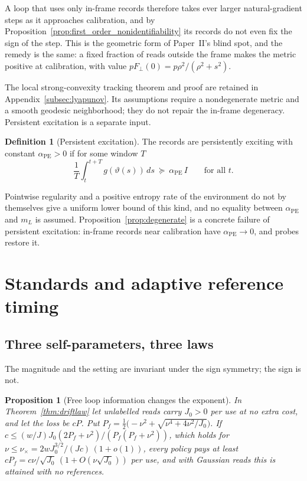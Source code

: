 \documentclass[12pt]{article}
\newtheorem{proposition}[theorem]{Proposition}
\theoremstyle{definition}
\newtheorem{definition}[theorem]{Definition}
\begin{document}
A loop that uses only in-frame records therefore takes ever larger natural-gradient steps as it approaches calibration, and by Proposition~\ref{prop:first_order_nonidentifiability} its records do not even fix the sign of the step. This is the geometric form of Paper~II's blind spot, and the remedy is the same: a fixed fraction of reads outside the frame makes the metric positive at calibration, with value $pF_\perp(0)=p\rho^2/(\rho^2+s^2)$.

The local strong-convexity tracking theorem and proof are retained in
Appendix~\ref{subsec:lyapunov}. Its assumptions require a nondegenerate
metric and a smooth geodesic neighborhood; they do not repair the
in-frame degeneracy. Persistent excitation is a separate input.

\begin{definition}[Persistent excitation]
\label{def:PE_constant}
The records are persistently exciting with constant $\alpha_{\mathrm{PE}}>0$ if for some window $T$
\begin{equation}
\label{eq:PE_constant}
\frac1T\int_t^{t+T}g(\vartheta(s))\,ds\ \succeq\ \alpha_{\mathrm{PE}}\,I\qquad\text{for all }t.
\end{equation}
\end{definition}

Pointwise regularity and a positive entropy rate of the environment do not by themselves give a uniform lower bound of this kind, and no equality between $\alpha_{\mathrm{PE}}$ and $m_L$ is assumed. Proposition~\ref{prop:degenerate} is a concrete failure of persistent excitation: in-frame records near calibration have $\alpha_{\mathrm{PE}}\to0$, and probes restore it.

\section{Standards and adaptive reference timing}
\label{app:three-laws}

\subsection{Three self-parameters, three laws}
\label{subsec:J_laws}

The magnitude and the setting are invariant under the sign symmetry; the sign is not.

\begin{proposition}[Free loop information changes the exponent]
\label{prop:J0}
In Theorem~\ref{thm:driftlaw} let unlabelled reads carry $J_0>0$ per use at no extra cost, and let the loss be $cP$. Put $P_f=\tfrac12\bigl(-\nu^2+\sqrt{\nu^4+4\nu^2/J_0}\bigr)$. If $c\le(w/J)J_0(2P_f+\nu^2)/(P_f(P_f+\nu^2))$, which holds for $\nu\le\nu_\times=2wJ_0^{3/2}/(Jc)\,(1+o(1))$, every policy pays at least $cP_f=c\nu/\sqrt{J_0}\,(1+O(\nu\sqrt{J_0}))$ per use, and with Gaussian reads this is attained with no references.
\end{proposition}
\end{document}
